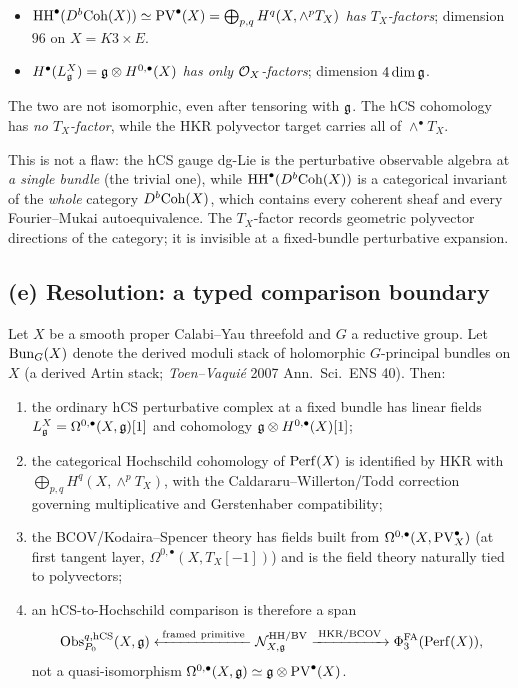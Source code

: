 \begin{itemize}
\item $\mathrm{HH}^\bullet(D^b\mathrm{Coh}(X)) \simeq \mathrm{PV}^\bullet(X) =
 \bigoplus_{p,q} H^q(X,\wedge^p T_X)$ \emph{has $T_X$-factors};
 dimension $96$ on $X = K3\times E$.
\item $H^\bullet(L_{\mathfrak{g}}^X) = \mathfrak{g}\otimes H^{0,\bullet}(X)$
 \emph{has only $\mathcal{O}_X$-factors}; dimension $4\dim\mathfrak{g}$.
\end{itemize}
The two are not isomorphic, even after tensoring with $\mathfrak{g}$. The
hCS cohomology has \emph{no $T_X$-factor}, while the HKR polyvector
target carries all of $\wedge^\bullet T_X$.

This is not a flaw: the hCS gauge dg-Lie is the perturbative observable
algebra at \emph{a single bundle} (the trivial one), while
$\mathrm{HH}^\bullet(D^b\mathrm{Coh}(X))$ is a categorical invariant of the
\emph{whole} category $D^b\mathrm{Coh}(X)$, which contains every coherent
sheaf and every Fourier--Mukai autoequivalence. The $T_X$-factor
records geometric polyvector directions of the category; it is
invisible at a fixed-bundle perturbative expansion.

\subsection*{(e) Resolution: a typed comparison boundary}

\begin{theorem}
\label{thm:hkr-vs-hcs-resolution}
Let $X$ be a smooth proper Calabi--Yau threefold and $G$ a reductive
group. Let $\mathrm{Bun}_G(X)$ denote the derived moduli stack of holomorphic
$G$-principal bundles on $X$ (a derived Artin stack; \emph{Toen--Vaqui\'e}
2007 Ann.\ Sci.\ ENS 40). Then:
\begin{enumerate}[label=(\roman*)]
\item the ordinary hCS perturbative complex at a fixed bundle has
linear fields $L_{\mathfrak{g}}^X=\Omega^{0,\bullet}(X,\mathfrak{g})[1]$ and
cohomology $\mathfrak{g}\otimes H^{0,\bullet}(X)[1]$;
\item the categorical Hochschild cohomology of $\mathrm{Perf}(X)$ is identified
by HKR with $\bigoplus_{p,q}H^q(X,\wedge^pT_X)$, with the
Caldararu--Willerton/Todd correction governing multiplicative and
Gerstenhaber compatibility;
\item the BCOV/Kodaira--Spencer theory has fields built from
$\Omega^{0,\bullet}(X,\mathrm{PV}^\bullet_X)$ \textup{(}at first tangent layer,
$\Omega^{0,\bullet}(X,T_X[-1])$\textup{)} and is the field theory
naturally tied to polyvectors;
\item an hCS-to-Hochschild comparison is therefore a span
\[
 \mathrm{Obs}^{q,\mathrm{hCS}}_{P_0}(X,\mathfrak{g})
 \xleftarrow{\;\mathrm{framed\ primitive}\;}
 \mathcal N_{X,\mathfrak{g}}^{\mathrm{HH/BV}}
 \xrightarrow{\;\mathrm{HKR/BCOV}\;}
 \Phi^{\mathrm{FA}}_3(\mathrm{Perf}(X)) ,
\]
not a quasi-isomorphism
$\Omega^{0,\bullet}(X,\mathfrak{g})\simeq \mathfrak{g}\otimes\mathrm{PV}^\bullet(X)$.
\end{enumerate}
\end{theorem}

